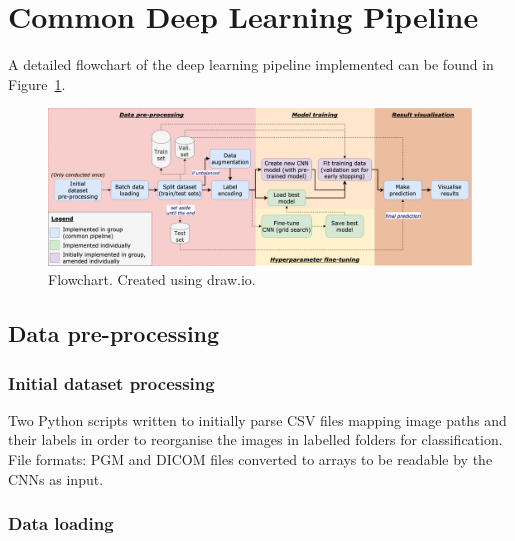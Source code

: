 
\section{Common Deep Learning Pipeline}

A detailed flowchart of the deep learning pipeline implemented can be found in  Figure~\ref{fig:implementation-detailed-flowchart}.

\begin{figure}[ht]
\centerline{\includegraphics[width=1.25\textwidth]{Dissertation/figures/implementation/detailed flowchart.png}}
\caption{\label{fig:implementation-detailed-flowchart}Flowchart. Created using draw.io.}
\end{figure}


\subsection{Data pre-processing}

\subsubsection{Initial dataset processing}

Two Python scripts written to initially parse CSV files mapping image paths and their labels in order to reorganise the images in labelled folders for classification.\\

File formats: PGM and DICOM files converted to arrays to be readable by the CNNs as input.\\


\subsubsection{Data loading}


